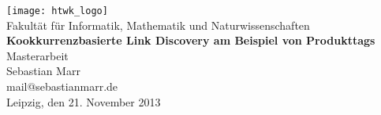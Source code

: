 \thispagestyle{plain}
\begin{titlepage}
\begin{center}
\texttt{[image: htwk\_logo]}\\
\vspace{0.3cm}
\normalsize
Fakultät für Informatik, Mathematik und Naturwissenschaften\\
\vspace{3cm}
\huge{\textbf{\textsf{Kookkurrenzbasierte Link Discovery am Beispiel von Produkttags}}}\\
\vspace{1cm}
\LARGE{\textsf{Masterarbeit}}\\
\vspace{3cm}
\normalsize
Sebastian Marr\\
mail@sebastianmarr.de\\
\vspace{3cm}
Leipzig, den 21. November 2013
\end{center}
\end{titlepage}